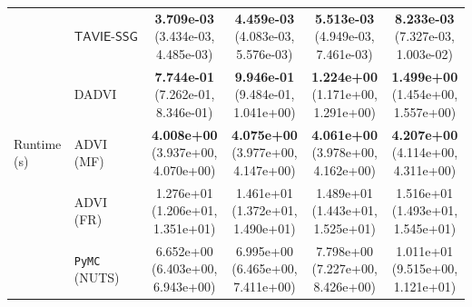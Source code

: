 \documentclass[12pt]{article}
\numberwithin{equation}{section}
\newcommand{\tssg}{\mathsf{TAVIE}\text{-}\mathsf{SSG}}
\begin{document}
{\begin{longtable}{llcccc}
\multirow{5}{*}{Runtime (s)}
& $\tssg$ & \makecell[c]{\textbf{3.709e-03}\\(3.434e-03, 4.485e-03)} & \makecell[c]{\textbf{4.459e-03}\\(4.083e-03, 5.576e-03)} & \makecell[c]{\textbf{5.513e-03}\\(4.949e-03, 7.461e-03)} & \makecell[c]{\textbf{8.233e-03}\\(7.327e-03, 1.003e-02)} \\
& DADVI & \makecell[c]{\textbf{7.744e-01}\\(7.262e-01, 8.346e-01)} & \makecell[c]{\textbf{9.946e-01}\\(9.484e-01, 1.041e+00)} & \makecell[c]{\textbf{1.224e+00}\\(1.171e+00, 1.291e+00)} & \makecell[c]{\textbf{1.499e+00}\\(1.454e+00, 1.557e+00)} \\
& ADVI (MF) & \makecell[c]{\textbf{4.008e+00}\\(3.937e+00, 4.070e+00)} & \makecell[c]{\textbf{4.075e+00}\\(3.977e+00, 4.147e+00)} & \makecell[c]{\textbf{4.061e+00}\\(3.978e+00, 4.162e+00)} & \makecell[c]{\textbf{4.207e+00}\\(4.114e+00, 4.311e+00)} \\
& ADVI (FR) & \makecell[c]{1.276e+01\\(1.206e+01, 1.351e+01)} & \makecell[c]{1.461e+01\\(1.372e+01, 1.490e+01)} & \makecell[c]{1.489e+01\\(1.443e+01, 1.525e+01)} & \makecell[c]{1.516e+01\\(1.493e+01, 1.545e+01)} \\
& \texttt{PyMC} (NUTS) & \makecell[c]{6.652e+00\\(6.403e+00, 6.943e+00)} & \makecell[c]{6.995e+00\\(6.465e+00, 7.411e+00)} & \makecell[c]{7.798e+00\\(7.227e+00, 8.426e+00)} & \makecell[c]{1.011e+01\\(9.515e+00, 1.121e+01)} \\
\hline
\end{longtable}
}
\end{document}
